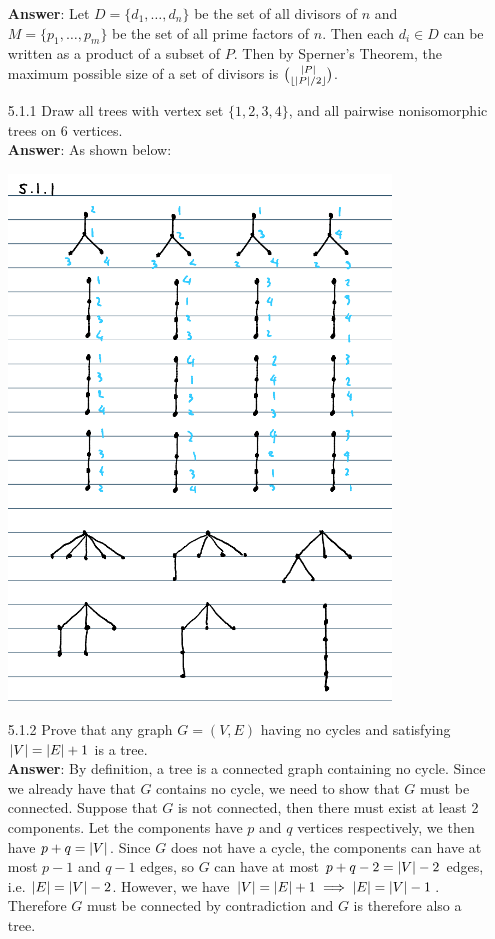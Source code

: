 \documentclass{article}
\begin{document}
\begin{itemize}
            \textbf{Answer}: Let $D=\{d_1,\ldots,d_n\}$ be the set of all divisors of $n$ and $M=\{p_1,\ldots,p_m\}$ be the set of all prime factors of $n$. Then each $d_i\in D$ can be written as a product of a subset of $P$. Then by Sperner's Theorem, the maximum possible size of a set of divisors is $\binom{\abs{P}}{\lfloor\abs{P}/2\rfloor}$.
      \item [5.1.1] Draw all trees with vertex set $\{1,2,3,4\}$, and all pairwise nonisomorphic trees on 6 vertices.\\
            \textbf{Answer}: As shown below:
            \begin{center}
                  \includegraphics[width=4in]{5-1-1.png}
            \end{center}
      \item [5.1.2] Prove that any graph $G=(V,E)$ having no cycles and satisfying $\abs{V}=\abs{E}+1$ is a tree.\\
            \textbf{Answer}: By definition, a tree is a connected graph containing no cycle. Since we already have that $G$ contains no cycle, we need to show that $G$ must be connected. Suppose that $G$ is not connected, then there must exist at least 2 components. Let the components have $p$ and $q$ vertices respectively, we then have $p+q=\abs{V}$. Since $G$ does not have a cycle, the components can have at most $p-1$ and $q-1$ edges, so $G$ can have at most $p+q-2=\abs{V}-2$ edges, i.e. $\abs{E}=\abs{V}-2$. However, we have $\abs{V}=\abs{E}+1\implies\abs{E}=\abs{V}-1$. Therefore $G$ must be connected by contradiction and $G$ is therefore also a tree.

\end{itemize}
\end{document}
